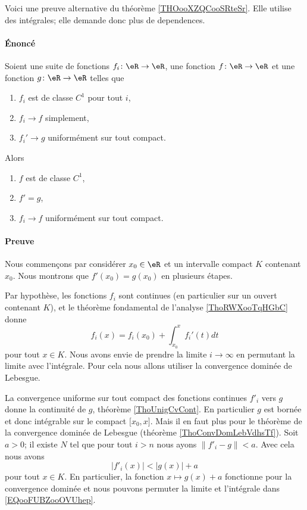 \begin{normaltext}      \label{NORMALooGYUEooKrYjyz}
	Voici une preuve alternative du théorème \ref{THOooXZQCooSRteSr}. Elle utilise des intégrales; elle demande donc plus de dependences.

	\paragraph{Énoncé}
	Soient une suite de fonctions \( f_i\colon \eR\to \eR\), une fonction \( f\colon \eR\to \eR\) et une fonction \( g\colon \eR\to \eR\) telles que
	\begin{enumerate}
		\item
		      \( f_i\) est de classe \( C^1\) pour tout \( i\),
		\item
		      \( f_i\to f\) simplement,
		\item
		      \( f_i'\to g\) uniformément sur tout compact.
	\end{enumerate}
	Alors
	\begin{enumerate}
		\item
		      \( f\) est de classe \( C^1\),
		\item
		      \( f'=g\),
		\item
		      \( f_i\to f\) uniformément sur tout compact.
	\end{enumerate}
	\paragraph{Preuve}

	Nous commençons par considérer \( x_0\in \eR\) et un intervalle compact \( K\) contenant \( x_0\). Nous montrons que \( f'(x_0)=g(x_0)\) en plusieurs étapes.
	\begin{subproof}
		Par hypothèse, les fonctions \( f_i\) sont continues (en particulier sur un ouvert contenant \( K\)), et le théorème fondamental de l'analyse \ref{ThoRWXooTqHGbC} donne
		\begin{equation}        \label{EQooFUBZooOVUhep}
			f_i(x)=f_i(x_0)+\int_{x_0}^xf_i'(t)dt
		\end{equation}
		pour tout \( x\in K\). Nous avons envie de prendre la limite \( i\to \infty\) en permutant la limite avec l'intégrale. Pour cela nous allons utiliser la convergence dominée de Lebesgue.

		La convergence uniforme sur tout compact des fonctions continues \( f'_i\) vers \( g\) donne la continuité de \( g\), théorème \ref{ThoUnigCvCont}. En particulier \( g\) est bornée et donc intégrable sur le compact \( \mathopen[ x_0 , x \mathclose]\). Mais il en faut plus pour le théorème de la convergence dominée de Lebesgue (théorème \ref{ThoConvDomLebVdhsTf}). Soit \( a>0\); il existe \( N\) tel que pour tout \( i>n\) nous ayons \( \| f'_i-g \|<a\). Avec cela nous avons
		\begin{equation}
			| f'_i(x) |<| g(x) |+a
		\end{equation}
		pour tout \( x\in K\). En particulier, la fonction \( x\mapsto g(x)+a\) fonctionne pour la convergence dominée et nous pouvons permuter la limite et l'intégrale dans \eqref{EQooFUBZooOVUhep}.


\end{subproof}
\end{normaltext}

